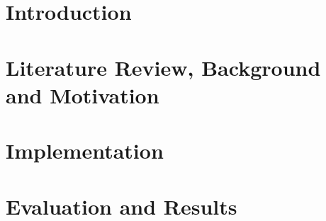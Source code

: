 \chapter{Introduction}
\label{chap:intro}

\chapter{Literature Review, Background and Motivation}
\label{chap:Literature}

\chapter{Implementation}
\label{chap:implemetation}

\chapter{Evaluation and Results}
\label{chap:resutls}